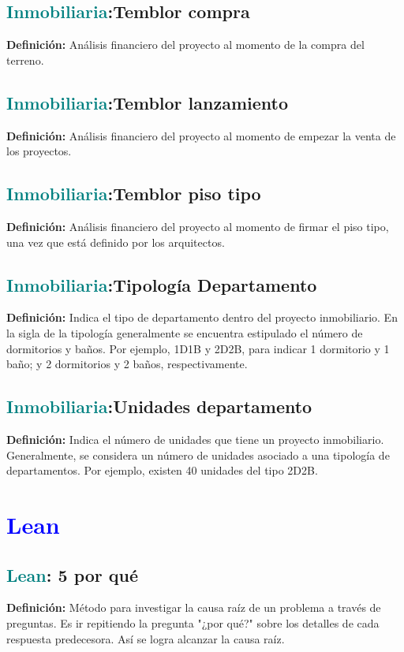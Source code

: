 \documentclass[12pt]{article}
\begin{document}
\subsection{\textcolor{teal}{Inmobiliaria}:{Temblor compra}}
\textbf{Definición:} Análisis financiero del proyecto al momento de la compra del terreno.
\subsection{\textcolor{teal}{Inmobiliaria}:{Temblor lanzamiento}}
\textbf{Definición:} Análisis financiero del proyecto al momento de empezar la venta de los proyectos.
\subsection{\textcolor{teal}{Inmobiliaria}:{Temblor piso tipo}}
\textbf{Definición:} Análisis financiero del proyecto al momento de firmar el piso tipo, una vez que está definido por los arquitectos.
\subsection{\textcolor{teal}{Inmobiliaria}:{Tipología Departamento}}
\textbf{Definición:} Indica el tipo de departamento dentro del proyecto inmobiliario. En la sigla de la tipología generalmente se encuentra estipulado el número de dormitorios y baños. Por ejemplo, 1D1B y 2D2B, para indicar 1 dormitorio y 1 baño; y 2 dormitorios y 2 baños, respectivamente.
\subsection{\textcolor{teal}{Inmobiliaria}:{Unidades departamento}}
\textbf{Definición:} Indica el número de unidades que tiene un proyecto inmobiliario. Generalmente, se considera un número de unidades asociado a una tipología de departamentos. Por ejemplo, existen 40 unidades del tipo 2D2B.
\section{\textcolor{blue}{Lean}}
\subsection{\textcolor{teal}{Lean}:{ 5 por qué}}
\textbf{Definición:} Método para investigar la causa raíz de un problema a través de preguntas. Es ir repitiendo la pregunta "¿por qué?" sobre los detalles de cada respuesta predecesora. Así se logra alcanzar la causa raíz.
\end{document}
